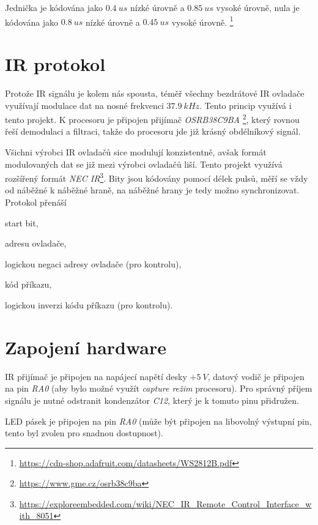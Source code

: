 \documentclass[12pt,a4paper]{article}
\begin{document}
Jednička je kódována jako $0.4\ us$ nízké úrovně a $0.85\ us$ vysoké úrovně,
nula je kódována jako $0.8\ us$ nízké úrovně a $0.45\ us$ vysoké úrovně.
\footnote{\url{https://cdn-shop.adafruit.com/datasheets/WS2812B.pdf}}

\section{IR protokol}

Protože IR signálu je kolem nás spousta, téměř všechny bezdrátové IR ovladače
využívají modulace dat na nosné frekvenci $37.9\ kHz$. Tento princip využívá
i tento projekt. K procesoru je připojen přijímač \textit{OSRB38C9BA}
\footnote{\url{https://www.gme.cz/osrb38c9ba}}, který rovnou řeší demodulaci
a filtraci, takže do procesoru jde již krásný obdélníkový signál.

Všichni výrobci IR ovladačů sice modulují konzistentně, avšak formát modulovaných
dat se již mezi výrobci ovladačů liší. Tento projekt využívá rozšířený formát
\textit{NEC IR}\footnote{\url{https://exploreembedded.com/wiki/NEC_IR_Remote_Control_Interface_with_8051}}.
Bity jsou kódovány pomocí délek pulsů, měří se vždy od náběžné k náběžné hraně,
na náběžné hrany je tedy možno synchronizovat. Protokol přenáší

\begin{compactenum}
\item start bit,
\item adresu ovladače,
\item logickou negaci adresy ovladače (pro kontrolu),
\item kód příkazu,
\item logickou inverzi kódu příkazu (pro kontrolu).
\end{compactenum}

\section{Zapojení hardware}

IR přijímač je připojen na napájecí napětí desky $+5\ V$, datový vodič je
připojen na pin \textit{RA0} (aby bylo možné využít \textit{capture režim}
procesoru).  Pro správný příjem signálu je nutné odstranit kondenzátor
\textit{C12}, který je k tomuto pinu přidružen.

LED pásek je připojen na pin \textit{RA0} (může být připojen na libovolný
výstupní pin, tento byl zvolen pro snadnou dostupnost).
\end{document}
